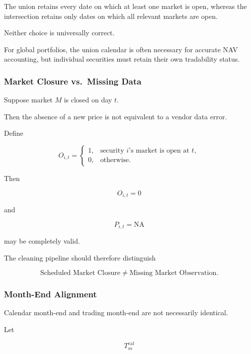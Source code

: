 \documentclass[11pt,a4paper]{article}
\begin{document}
The union retains every date on which at least one market is open, whereas the
intersection retains only dates on which all relevant markets are open.

Neither choice is universally correct.

For global portfolios, the union calendar is often necessary for accurate NAV
accounting, but individual securities must retain their own tradability status.


\subsubsection{Market Closure vs.\ Missing Data}

Suppose market $M$ is closed on day $t$.

Then the absence of a new price is not equivalent to a vendor data error.

Define

\begin{equation}
O_{i,t}
=
\begin{cases}
1,
&
\text{security }i\text{'s market is open at }t,
\\
0,
&
\text{otherwise}.
\end{cases}
\end{equation}

Then

\begin{equation}
O_{i,t}=0
\end{equation}

and

\begin{equation}
P_{i,t}=\mathrm{NA}
\end{equation}

may be completely valid.

The cleaning pipeline should therefore distinguish

\begin{equation}
\boxed{
\text{Scheduled Market Closure}
\neq
\text{Missing Market Observation}.
}
\end{equation}


\subsubsection{Month-End Alignment}

Calendar month-end and trading month-end are not necessarily identical.

Let

\begin{equation}
T_m^{\mathrm{cal}}
\end{equation}
\end{document}

